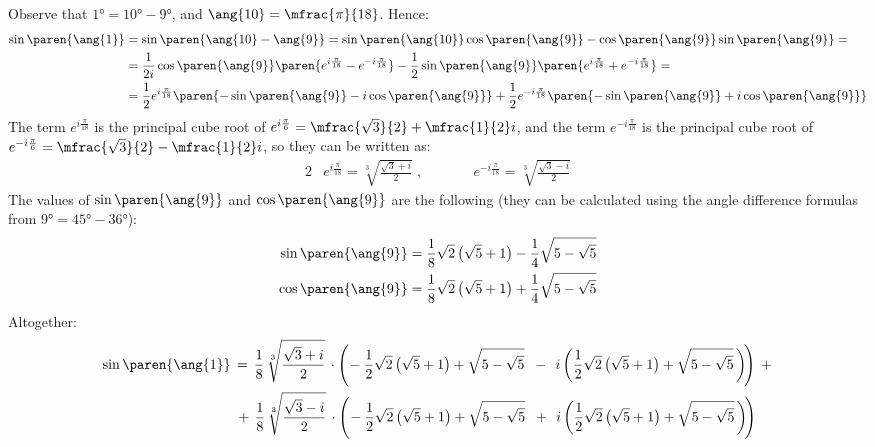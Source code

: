 Observe that
$\ang{1} = \ang{10} - \ang{9}$,
and $\ang{10} = \mfrac{\pi}{18}$.
Hence:
\begin{align*}
 \sin\paren{\ang{1}}
 &= \sin\paren{\ang{10} - \ang{9}}
  = \sin\paren{\ang{10}} \cos\paren{\ang{9}}
    - \cos\paren{\ang{9}} \sin\paren{\ang{9}} = \\
 &= \frac{1}{2 i} \cos\paren{\ang{9}}
    \paren{e^{i \frac{\pi}{18}} - e^{ -i \frac{\pi}{18}}}
    - \frac{1}{2} \sin\paren{\ang{9}}
    \paren{e^{i \frac{\pi}{18}} + e^{ -i \frac{\pi}{18}}} = \\
 &= \frac{1}{2} e^{i \frac{\pi}{18}}
    \paren{ - \sin\paren{\ang{9}} - i \cos\paren{\ang{9}}}
    + \frac{1}{2} e^{ -i \frac{\pi}{18}}
    \paren{ - \sin\paren{\ang{9}} + i \cos\paren{\ang{9}}}
\end{align*}
The term $e^{i \frac{\pi}{18}}$
is the principal cube root of
$e^{i \frac{\pi}{6}} = \mfrac{\sqrt{3}}{2} + \mfrac{1}{2} i$,
and the term $e^{- i \frac{\pi}{18}}$
is the principal cube root of
$e^{- i \frac{\pi}{6}} = \mfrac{\sqrt{3}}{2} - \mfrac{1}{2} i$,
so they can be written as:
\begin{alignat*}{2}
 & e^{i \frac{\pi}{18}}
 = \sqrt[3]{\frac{\sqrt{3} + i}{2}} \; , && \qquad
 e^{- i \frac{\pi}{18}}
 = \sqrt[3]{\frac{\sqrt{3} - i}{2}}
\end{alignat*}
The values of $\sin\paren{\ang{9}}$ and $\cos\paren{\ang{9}}$ are the following
(they can be calculated using the angle difference formulas from $\ang{9} = \ang{45} - \ang{36}$):
\begin{align*}
 \sin\paren{\ang{9}}
 &= \frac{1}{8} \sqrt{2} \, \big(\sqrt{5} + 1 \big)
   - \frac{1}{4} \sqrt{5 - \sqrt{5}}
 \\
 \cos\paren{\ang{9}}
 &= \frac{1}{8} \sqrt{2} \, \big(\sqrt{5} + 1 \big)
   + \frac{1}{4} \sqrt{5 - \sqrt{5}}
\end{align*}
Altogether:
\begin{equation*}
\begin{split}
 \sin\paren{\ang{1}} \,
 &= \, \frac{1}{8} \, \sqrt[3]{\frac{\sqrt{3} + i}{2}}
   \, \cdot
   \Bigg( \!
     - \frac{1}{2} \sqrt{2} \, \big(\sqrt{5} + 1 \big)
     + \sqrt{5 - \sqrt{5}} \;\;
     - \,\; i \, \bigg(
     \frac{1}{2} \sqrt{2} \, \big(\sqrt{5} + 1 \big)
     + \sqrt{5 - \sqrt{5}} \,
     \bigg) \!
   \Bigg) \,\; +
 \\
   &\, + \, \frac{1}{8} \, \sqrt[3]{\frac{\sqrt{3} - i}{2}}
   \, \cdot
   \Bigg( \!
     - \frac{1}{2} \sqrt{2} \, \big(\sqrt{5} + 1 \big)
     + \sqrt{5 - \sqrt{5}} \;\;
     + \,\; i \, \bigg(
     \frac{1}{2} \sqrt{2} \, \big(\sqrt{5} + 1 \big)
     + \sqrt{5 - \sqrt{5}} \,
     \bigg) \!
   \Bigg)
\end{split}
\end{equation*}
